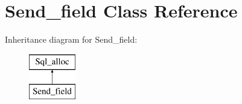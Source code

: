 \hypertarget{classSend__field}{}\section{Send\+\_\+field Class Reference}
\label{classSend__field}
Inheritance diagram for Send\+\_\+field\+:\begin{figure}[H]
\begin{center}
\leavevmode
\includegraphics[height=2.000000cm]{classSend__field}
\end{center}
\end{figure}
